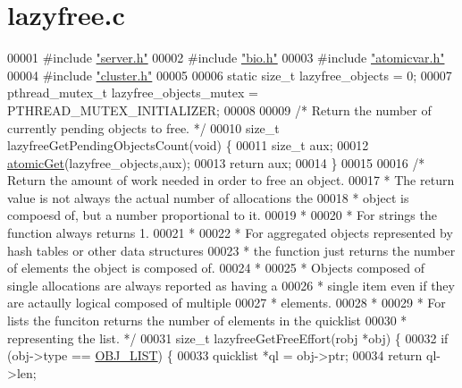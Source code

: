 \hypertarget{lazyfree_8c_source}{}\section{lazyfree.\+c}
\label{lazyfree_8c_source}

\begin{DoxyCode}
00001 \textcolor{preprocessor}{#}\textcolor{preprocessor}{include} \hyperlink{server_8h}{"server.h"}
00002 \textcolor{preprocessor}{#}\textcolor{preprocessor}{include} \hyperlink{bio_8h}{"bio.h"}
00003 \textcolor{preprocessor}{#}\textcolor{preprocessor}{include} \hyperlink{atomicvar_8h}{"atomicvar.h"}
00004 \textcolor{preprocessor}{#}\textcolor{preprocessor}{include} \hyperlink{cluster_8h}{"cluster.h"}
00005 
00006 \textcolor{keyword}{static} size\_t lazyfree\_objects = 0;
00007 pthread\_mutex\_t lazyfree\_objects\_mutex = PTHREAD\_MUTEX\_INITIALIZER;
00008 
00009 \textcolor{comment}{/* Return the number of currently pending objects to free. */}
00010 size\_t lazyfreeGetPendingObjectsCount(\textcolor{keywordtype}{void}) \{
00011     size\_t aux;
00012     \hyperlink{atomicvar_8h_a57b17e058ecff6871debb3d1d4f3031a}{atomicGet}(lazyfree\_objects,aux);
00013     \textcolor{keywordflow}{return} aux;
00014 \}
00015 
00016 \textcolor{comment}{/* Return the amount of work needed in order to free an object.}
00017 \textcolor{comment}{ * The return value is not always the actual number of allocations the}
00018 \textcolor{comment}{ * object is compoesd of, but a number proportional to it.}
00019 \textcolor{comment}{ *}
00020 \textcolor{comment}{ * For strings the function always returns 1.}
00021 \textcolor{comment}{ *}
00022 \textcolor{comment}{ * For aggregated objects represented by hash tables or other data structures}
00023 \textcolor{comment}{ * the function just returns the number of elements the object is composed of.}
00024 \textcolor{comment}{ *}
00025 \textcolor{comment}{ * Objects composed of single allocations are always reported as having a}
00026 \textcolor{comment}{ * single item even if they are actaully logical composed of multiple}
00027 \textcolor{comment}{ * elements.}
00028 \textcolor{comment}{ *}
00029 \textcolor{comment}{ * For lists the funciton returns the number of elements in the quicklist}
00030 \textcolor{comment}{ * representing the list. */}
00031 size\_t lazyfreeGetFreeEffort(robj *obj) \{
00032     \textcolor{keywordflow}{if} (obj->type == \hyperlink{server_8h_a4a5f22a280949c97a0cb0d4213275126}{OBJ\_LIST}) \{
00033         quicklist *ql = obj->ptr;
00034         \textcolor{keywordflow}{return} ql->len;

\end{DoxyCode}
